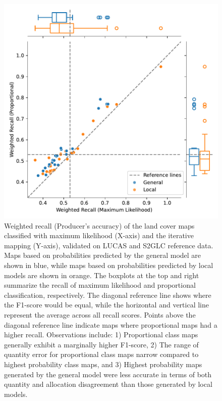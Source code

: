     \begin{figure}[H]
        \centering
        \includegraphics[width=\linewidth]{figs_04/fig10_jointplot_recall.pdf}
        \caption{Weighted recall (Producer's accuracy) of the land cover maps classified with maximum likelihood (X-axis) and the iterative mapping (Y-axis), validated on LUCAS and S2GLC reference data. Maps based on probabilities predicted by the general model are shown in blue, while maps based on probabilities predicted by local models are shown in orange. The boxplots at the top and right summarize the recall of maximum likelihood and proportional classification, respectively. The diagonal reference line shows where the F1-score would be equal, while the horizontal and vertical line represent the average across all recall scores. Points above the diagonal reference line indicate maps where proportional maps had a higher recall. 
        Observations include: 1) Proportional class maps generally exhibit a marginally higher F1-score, 2) The range of quantity error for proportional class maps narrow compared to highest probability class maps, and 3) Highest probability maps generated by the general model were less accurate in terms of both quantity and allocation disagreement than those generated by local models.}
        \label{fig:recall}
    \end{figure}

